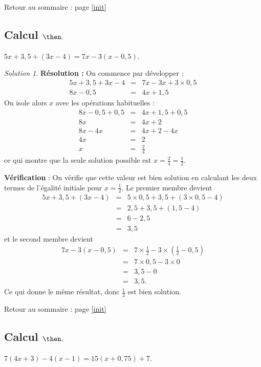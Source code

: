 \documentclass[14pt]{article}
\theoremstyle{remark}
\newtheorem*{sol}{Solution}
\newcounter{n}
\renewcommand{\it}{Retour au sommaire : page \ref{init}
	\subsection{Calcul $ \mathbf{ \then}.$}\label{\then} \stepcounter{n} }
\theoremstyle{plain}
\begin{document}
\it $5x+3,5+(3x-4) = 7x-3(x-0,5)$. 
\begin{sol}
\textbf{Résolution :} On commence par développer : 
\begin{eqnarray*} 5x + 3,5 + 3x- 4 &=& 7x - 3x +3\times0,5\\
8x -0,5 &=& 4x  + 1,5 \end{eqnarray*}
On isole alors $x$ avec les opérations habituelles : 
\begin{eqnarray*}
8x - 0,5+0,5 &=& 4x+1,5+0,5\\
8x &= &4x+2\\
8x-4x&=&4x+2-4x\\
4x &=& 2\\
x&=& \frac24
\end{eqnarray*}
ce qui montre que la seule solution possible est $x=\frac24=\frac12$. 

\textbf{Vérification} : On vérifie que cette valeur est bien solution en calculant les deux termes de l'égalité initiale pour $x=\frac12$.
Le premier membre devient \begin{eqnarray*}
5x+3,5+(3x-4) &=& 5\times0,5 + 3,5 + (3\times 0,5 -4) \\
&=& 2,5+3,5 + (1,5-4) \\
&=& 6 -2,5\\
&=& 3,5
\end{eqnarray*}
et le second membre devient 
\begin{eqnarray*}
7x-3(x-0,5) &=& 7\times\frac12 -3\times(\frac12-0,5) \\
&=& 7\times0,5 - 3\times 0 \\
&=& 3,5-0 \\
&=& 3,5.
\end{eqnarray*}
Ce qui donne le même résultat, donc $\frac12$ est bien solution. 
\end{sol}
\it $7(4x+3)-4(x-1)=15(x+0,75)+7$. 
\end{document}

